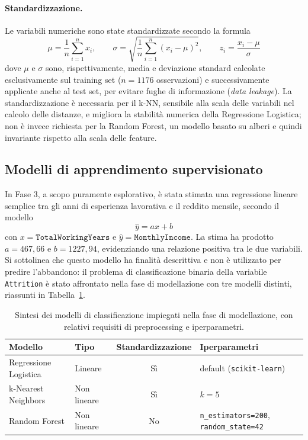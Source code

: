 \documentclass{article}
\begin{document}
\paragraph{Standardizzazione.} Le variabili numeriche sono state standardizzate secondo la formula
\begin{equation}
\mu = \frac{1}{n}\sum_{i=1}^{n} x_i, \qquad \sigma = \sqrt{\frac{1}{n}\sum_{i=1}^{n}(x_i - \mu)^2}, \qquad z_i = \frac{x_i - \mu}{\sigma}
\label{eq:standardizzazione}
\end{equation}
dove $\mu$ e $\sigma$ sono, rispettivamente, media e deviazione standard calcolate esclusivamente sul training set ($n=1176$ osservazioni) e successivamente applicate anche al test set, per evitare fughe di informazione (\emph{data leakage}). La standardizzazione è necessaria per il k-NN, sensibile alla scala delle variabili nel calcolo delle distanze, e migliora la stabilità numerica della Regressione Logistica; non è invece richiesta per la Random Forest, un modello basato su alberi e quindi invariante rispetto alla scala delle feature.

\subsection{Modelli di apprendimento supervisionato}
\label{sec:metodologia-modelli}

In Fase 3, a scopo puramente esplorativo, è stata stimata una regressione lineare semplice tra gli anni di esperienza lavorativa e il reddito mensile, secondo il modello
\begin{equation}
\hat{y} = ax + b
\label{eq:reg_lineare}
\end{equation}
con $x = \texttt{TotalWorkingYears}$ e $\hat{y} = \texttt{MonthlyIncome}$. La stima ha prodotto $a = 467{,}66$ e $b = 1227{,}94$, evidenziando una relazione positiva tra le due variabili. Si sottolinea che questo modello ha finalità descrittiva e non è utilizzato per predire l'abbandono: il problema di classificazione binaria della variabile \texttt{Attrition} è stato affrontato nella fase di modellazione con tre modelli distinti, riassunti in Tabella~\ref{tab:modelli}.


\begin{table}[h]
\centering
\small %
\begin{tabular}{l l c l}
\hline
\textbf{Modello} & \textbf{Tipo} & \textbf{Standardizzazione} & \textbf{Iperparametri} \\
\hline
Regressione Logistica & Lineare & Sì & default (\texttt{scikit-learn}) \\
k-Nearest Neighbors & Non lineare & Sì & $k = 5$ \\
Random Forest & Non lineare & No & \texttt{n\_estimators=200}, \texttt{random\_state=42} \\
\hline
\end{tabular}
\caption{Sintesi dei modelli di classificazione impiegati nella fase di modellazione, con relativi requisiti di preprocessing e iperparametri.}
\label{tab:modelli}
\end{table}
\end{document}

